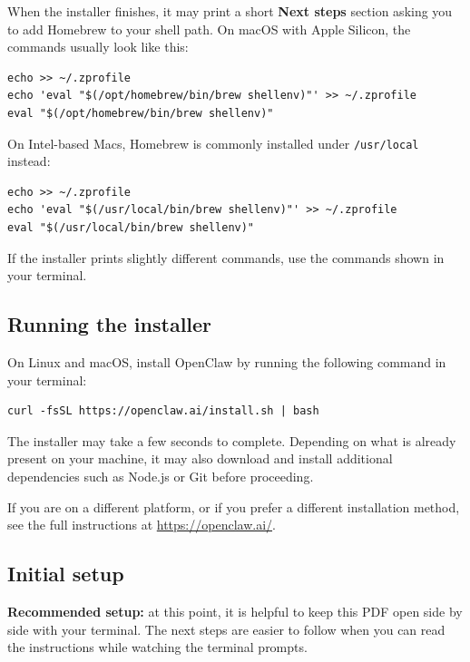 \documentclass[12pt, a4paper]{article}
\begin{document}
When the installer finishes, it may print a short \textbf{Next steps} section asking you to add Homebrew to your shell path. On macOS with Apple Silicon, the commands usually look like this:

\begin{lstlisting}[style=shellstyle]
echo >> ~/.zprofile
echo 'eval "$(/opt/homebrew/bin/brew shellenv)"' >> ~/.zprofile
eval "$(/opt/homebrew/bin/brew shellenv)"
\end{lstlisting}

On Intel-based Macs, Homebrew is commonly installed under \texttt{/usr/local} instead:

\begin{lstlisting}[style=shellstyle]
echo >> ~/.zprofile
echo 'eval "$(/usr/local/bin/brew shellenv)"' >> ~/.zprofile
eval "$(/usr/local/bin/brew shellenv)"
\end{lstlisting}

If the installer prints slightly different commands, use the commands shown in your terminal.

\subsection{Running the installer}

On Linux and macOS, install OpenClaw by running the following command in your terminal:

\begin{lstlisting}[style=shellstyle]
curl -fsSL https://openclaw.ai/install.sh | bash
\end{lstlisting}

The installer may take a few seconds to complete. Depending on what is already present on your machine, it may also download and install additional dependencies such as Node.js or Git before proceeding.

If you are on a different platform, or if you prefer a different installation method, see the full instructions at \url{https://openclaw.ai/}.

\subsection{Initial setup}

\begin{warnbox}
\textbf{Recommended setup:} at this point, it is helpful to keep this PDF open side by side with your terminal. The next steps are easier to follow when you can read the instructions while watching the terminal prompts.
\end{warnbox}
\end{document}
